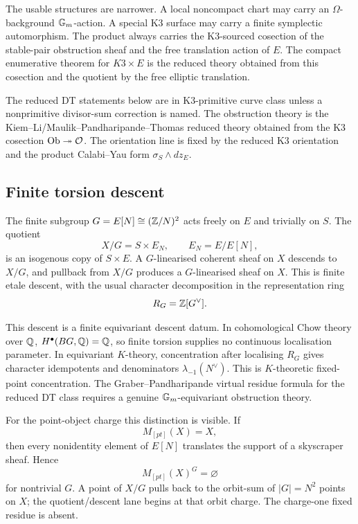 The usable structures are narrower.  A local noncompact chart may carry
an \(\Omega\)-background \(\mathbb G_m\)-action.  A special K3 surface may carry
a finite symplectic automorphism.  The product always carries the
K3-sourced cosection of the stable-pair obstruction sheaf and the free
translation action of \(E\).  The compact enumerative theorem for
\(K3\times E\) is the reduced theory obtained from this cosection and the
quotient by the free elliptic translation.

The reduced DT statements below are in K3-primitive curve class unless a
nonprimitive divisor-sum correction is named.  The obstruction theory is
the Kiem--Li/Maulik--Pandharipande--Thomas reduced theory obtained from
the K3 cosection \(\mathrm{Ob}\twoheadrightarrow\mathcal O\).  The orientation
line is fixed by the reduced K3 orientation and the product
Calabi--Yau form \(\sigma_S\wedge dz_E\).

\subsection*{Finite torsion descent}

The finite subgroup \(G=E[N]\cong(\mathbb Z/N)^2\) acts freely on \(E\) and
trivially on \(S\).  The quotient
\[
  X/G=S\times E_N,\qquad E_N=E/E[N],
\]
is an isogenous copy of \(S\times E\).  A \(G\)-linearised coherent sheaf
on \(X\) descends to \(X/G\), and pullback from \(X/G\) produces a
\(G\)-linearised sheaf on \(X\).  This is finite etale descent, with
the usual character decomposition in the representation ring
\[
  R_G=\mathbb Z[G^\vee].
\]

This descent is a finite equivariant descent datum.  In
cohomological Chow theory over \(\mathbb Q\), \(H^\bullet(BG,\mathbb Q)=\mathbb Q\), so
finite torsion supplies no continuous localisation parameter.  In
equivariant \(K\)-theory, concentration after localising \(R_G\) gives
character idempotents and denominators \(\lambda_{-1}(N^\vee)\).  This
is \(K\)-theoretic fixed-point concentration.  The
Graber--Pandharipande virtual residue formula for the reduced DT class
requires a genuine \(\mathbb G_m\)-equivariant obstruction theory.

For the point-object charge this distinction is visible.  If
\[
  M_{[pt]}(X)=X,
\]
then every nonidentity element of \(E[N]\) translates the support of a
skyscraper sheaf.  Hence
\[
  M_{[pt]}(X)^G=\varnothing
\]
for nontrivial \(G\).  A point of \(X/G\) pulls back to the orbit-sum of
\(|G|=N^2\) points on \(X\); the quotient/descent lane begins at that
orbit charge.  The charge-one fixed residue is absent.

